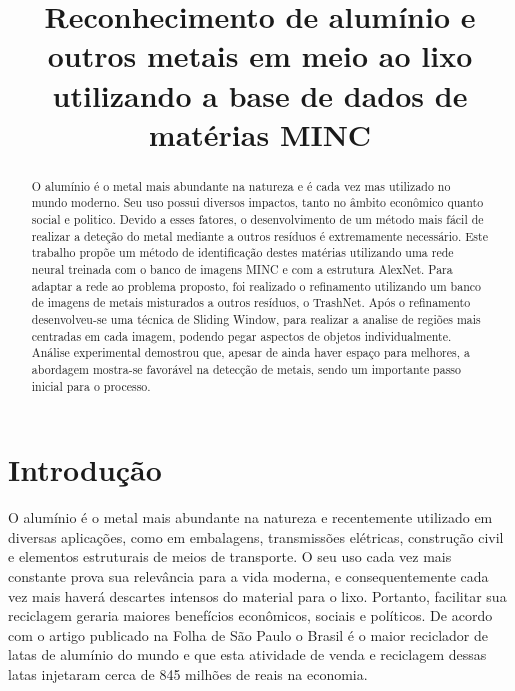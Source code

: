 \documentclass[conference, compsoc, 12pt]{IEEEtran}
\begin{document}
%
\title{Reconhecimento de alumínio e outros metais em meio ao lixo utilizando a base de dados de matérias MINC}

\author{
\and
{}
}

\maketitle


\IEEEpeerreviewmaketitle

\begin{abstract}
O alumínio é o metal mais abundante na natureza e é cada vez mas utilizado no mundo moderno. Seu uso possui diversos impactos, tanto no âmbito econômico quanto social e politico. Devido a esses fatores, o desenvolvimento de um método mais fácil de realizar a deteção do metal mediante a outros resíduos é extremamente necessário. Este trabalho propõe um método de identificação destes matérias utilizando uma rede neural treinada com o banco de imagens MINC e com a estrutura AlexNet. Para adaptar a rede ao problema proposto, foi realizado o refinamento utilizando um banco de imagens de metais misturados a outros resíduos, o TrashNet. Após o refinamento desenvolveu-se uma técnica de Sliding Window, para realizar a analise de regiões mais centradas em cada imagem, podendo pegar aspectos de objetos individualmente. Análise experimental demostrou que, apesar de ainda haver espaço para melhores, a abordagem mostra-se favorável na detecção de metais, sendo um importante passo inicial para o processo.
\end{abstract}


\section{Introdução}

O alumínio é o metal mais abundante na natureza e recentemente utilizado em diversas aplicações, como em embalagens, transmissões elétricas, construção civil e elementos estruturais de meios de transporte. O seu uso cada vez mais constante prova sua relevância para a vida moderna, e consequentemente cada vez mais haverá descartes intensos do material para o lixo. Portanto, facilitar sua reciclagem geraria maiores benefícios econômicos, sociais e políticos. De acordo com o artigo publicado na Folha de São Paulo o Brasil é o maior reciclador de latas de alumínio do mundo e que esta atividade de venda e reciclagem dessas latas injetaram cerca de 845 milhões de reais na economia.
\end{document}
